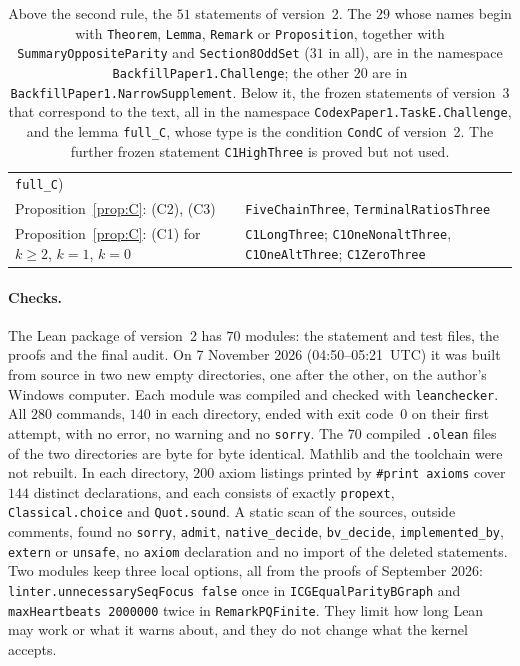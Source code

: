 \documentclass[11pt]{article}
\theoremstyle{remark}
\begin{document}
\begin{table}[ht]
\begin{tabular}{@{}>{\raggedright\arraybackslash}p{}
 >{\raggedright\arraybackslash}p{}@{}}
 \texttt{full\_C})\\
Proposition~\ref{prop:C}: (C2), (C3) & \texttt{FiveChainThree},
 \texttt{TerminalRatiosThree}\\
Proposition~\ref{prop:C}: (C1) for $k\ge2$, $k=1$, $k=0$ & \texttt{C1LongThree};
 \texttt{C1OneNonaltThree}, \texttt{C1OneAltThree}; \texttt{C1ZeroThree}\\
\bottomrule
\end{tabular}
\caption{Above the second rule, the $51$ statements of version~2. The $29$ whose
names begin with \texttt{Theorem}, \texttt{Lemma}, \texttt{Remark} or
\texttt{Proposition}, together with \texttt{SummaryOppositeParity} and
\texttt{Section8OddSet} ($31$ in all), are in the namespace
\texttt{BackfillPaper1.Challenge}; the other $20$ are in
\texttt{BackfillPaper1.NarrowSupplement}. Below it, the frozen statements of
version~3 that correspond to the text, all in the namespace
\texttt{CodexPaper1.TaskE.Challenge}, and the lemma \texttt{full\_C}, whose type is
the condition \texttt{CondC} of version~2. The further frozen statement
\texttt{C1HighThree} is proved but not used.}\label{tab:lean}
\end{table}

\paragraph{Checks.}
The Lean package of version~2 has $70$ modules: the statement and test files, the
proofs and the final audit. On 7 November 2026 (04:50--05:21~UTC) it was built from
source in two new empty directories, one after the other, on the author's Windows
computer. Each module was compiled and checked with \texttt{leanchecker}. All $280$
commands, $140$ in each directory, ended with exit code~$0$ on their first attempt,
with no error, no warning and no \texttt{sorry}. The $70$ compiled \texttt{.olean}
files of the two directories are byte for byte identical. Mathlib and the toolchain
were not rebuilt. In each directory, $200$ axiom listings printed by
\texttt{\#print axioms} cover $144$ distinct declarations, and each consists of
exactly \texttt{propext}, \texttt{Classical.choice} and \texttt{Quot.sound}. A static
scan of the sources, outside comments, found no \texttt{sorry}, \texttt{admit},
\texttt{native\_decide}, \texttt{bv\_decide}, \texttt{implemented\_by},
\texttt{extern} or \texttt{unsafe}, no \texttt{axiom} declaration and no import of
the deleted statements. Two modules keep three local options, all from the proofs of September 2026:
\texttt{linter.unnecessarySeqFocus false} once in \texttt{ICGEqualParityBGraph} and
\texttt{maxHeartbeats 2000000} twice in \texttt{RemarkPQFinite}. They limit how long
Lean may work or what it warns about, and they do not change what the kernel
accepts.
\end{document}
